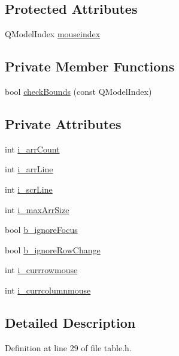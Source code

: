 \subsection*{Protected Attributes}
\begin{DoxyCompactItemize}
\item 
QModelIndex \hyperlink{classTableView_a489364559dd2e697eafec6cce3b67a1c}{mouseindex}
\end{DoxyCompactItemize}
\subsection*{Private Member Functions}
\begin{DoxyCompactItemize}
\item 
bool \hyperlink{classTableView_a62372425629462c3d4035b1f2676e847}{checkBounds} (const QModelIndex)
\end{DoxyCompactItemize}
\subsection*{Private Attributes}
\begin{DoxyCompactItemize}
\item 
int \hyperlink{classTableView_a6624fcee6052dd850b9437ed02ed27d8}{i\_\-arrCount}
\item 
int \hyperlink{classTableView_a1f1333ce0ba4e23da60de63d9324d522}{i\_\-arrLine}
\item 
int \hyperlink{classTableView_a5fc28c3171c5f26f2f60fac01173a57d}{i\_\-scrLine}
\item 
int \hyperlink{classTableView_a02c154332908ba1622903ac621ef31bb}{i\_\-maxArrSize}
\item 
bool \hyperlink{classTableView_a150be12afa3562146d290f26f10459b2}{b\_\-ignoreFocus}
\item 
bool \hyperlink{classTableView_a20a7e1035a96ddde81059ce744099798}{b\_\-ignoreRowChange}
\item 
int \hyperlink{classTableView_aed6ae9fb72681922a98a95e41ca84716}{i\_\-currrowmouse}
\item 
int \hyperlink{classTableView_a7b47dd87b8a2bcd86d413c2f19402429}{i\_\-currcolumnmouse}
\end{DoxyCompactItemize}


\subsection{Detailed Description}


Definition at line 29 of file table.h.



